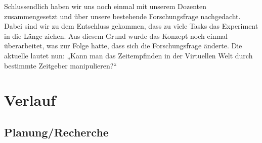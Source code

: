 \documentclass{Bericht}
\begin{document}
\par
Schlussendlich haben wir uns noch einmal mit unserem Dozenten zusammengesetzt und über unsere bestehende Forschungsfrage nachgedacht. Dabei sind wir zu dem Entschluss gekommen, dass zu viele Tasks das Experiment in die Länge ziehen. Aus diesem Grund wurde das Konzept noch einmal überarbeitet, was zur Folge hatte, dass sich die Forschungsfrage änderte. Die aktuelle lautet nun: „Kann man das Zeitempfinden in der Virtuellen Welt durch bestimmte Zeitgeber manipulieren?“


\clearpage
\section{Verlauf}
	\subsection{Planung/Recherche} %
	
\end{document}
